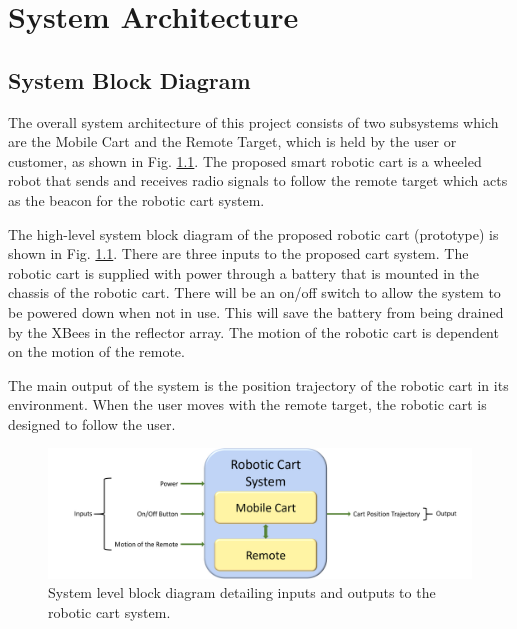 \chapter{System Architecture}
\label{ch: Chapter2}

\section{System Block Diagram}
The overall system architecture of this project consists of two subsystems which are the Mobile Cart and the Remote Target, which is held by the user or customer, as shown in Fig. \ref{fig:sys_block_diag}. The proposed smart robotic cart is a wheeled robot that sends and receives radio signals to follow the remote target which acts as the beacon for the robotic cart system.

\vspace*{12pt}
\noindent
The high-level system block diagram of the proposed robotic cart (prototype) is shown in Fig. \ref{fig:sys_block_diag}. There are three inputs to the proposed cart system. The robotic cart is supplied with power through a battery that is mounted in the chassis of the robotic cart. There will be an on/off switch to allow the system to be powered down when not in use. This will save the battery from being drained by the XBees in the reflector array. The motion of the robotic cart is dependent on the motion of the remote.

\vspace*{12pt}
\noindent
The main output of the system is the position trajectory of the robotic cart in its environment. When the user moves with the remote target, the robotic cart is designed to follow the user.

\begin{figure}[!h]
    \centering
    \includegraphics[width=\textwidth]{figs/img/systemBlockDiagram.png}
    \caption{System level block diagram detailing inputs and outputs to the
      robotic cart system.}
	\label{fig:sys_block_diag}
\end{figure}


